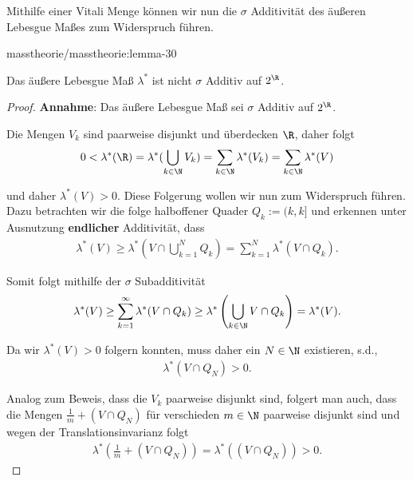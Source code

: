 \documentclass[letterpaper,10pt,english]{jupyterBook}
\begin{document}
\par
Mithilfe einer Vitali Menge können wir nun die \(\sigma\) Additivität des äußeren Lebesgue Maßes zum Widerspruch führen.
\begin{lemma}{}{masstheorie/masstheorie:lemma-30}



\par
Das äußere Lebesgue Maß \(\lambda^\ast\) ist nicht \(\sigma\) Additiv auf \(2^{\R}\).
\end{lemma}

\begin{proof}
 \textbf{Annahme}: Das äußere Lebesgue Maß sei \(\sigma\) Additiv auf \(2^{\R}\).

\par
Die Mengen \(V_k\) sind paarweise disjunkt und überdecken \(\R\), daher folgt
\begin{align*}
0<\lambda^\ast(\R) = \lambda^\ast(\bigcup_{k\in\N} V_k) = \sum_{k\in\N} \lambda^\ast(V_k) = \sum_{k\in\N} \lambda^\ast(V)
\end{align*}
\par
und daher \(\lambda^\ast(V)>0\). Diese Folgerung wollen wir nun zum Widerspruch führen. Dazu betrachten wir die folge halboffener Quader \(Q_k:=(k,k]\) und erkennen unter Ausnutzung \textbf{endlicher} Additivität, dass
\begin{align*}
\lambda^\ast(V) \geq \lambda^\ast\left(V \cap \bigcup_{k=1}^N Q_k\right) = 
\sum_{k=1}^N \lambda^\ast(V\cap Q_k).
\end{align*}
\par
Somit folgt mithilfe der \(\sigma\) Subadditivität
\begin{align*}
\lambda^\ast(V) \geq \sum_{k=1}^\infty \lambda^\ast(V\cap Q_k) \geq
\lambda^\ast\left(\bigcup_{k\in\N} V\cap Q_k\right) = \lambda^\ast(V).
\end{align*}
\par
Da wir \(\lambda^\ast(V)>0\) folgern konnten, muss daher ein \(N\in\N\) existieren, s.d.,
\begin{align*}
\lambda^\ast(V\cap Q_N) >0.
\end{align*}
\par
Analog zum Beweis, dass die \(V_k\) paarweise disjunkt sind, folgert man auch, dass die Mengen \(\frac{1}{m}+(V\cap Q_N)\) für verschieden \(m\in\N\) paarweise disjunkt sind und wegen der Translationsinvarianz folgt
\begin{align*}
\lambda^\ast(\frac{1}{m}+(V\cap Q_N)) = \lambda^\ast((V\cap Q_N)) >0.
\end{align*}

\end{proof}
\end{document}
